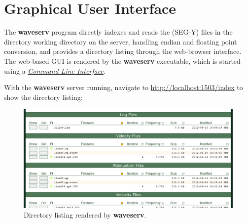 \documentclass[letterpaper,10pt,english]{sphinxmanual}
\begin{document}

\begin{fulllineitems}
\label{cli:cmdoption-waveserv-p}
\end{fulllineitems}



\chapter{Graphical User Interface}
\label{gui:gui}\label{gui::doc}\label{gui:graphical-user-interface}
The \textbf{waveserv} program directly indexes and reads the (SEG-Y) files in the directory working directory on the server, handling endian and floating point conversion, and provides a directory listing through the web-browser interface.  The web-based GUI is rendered by the \textbf{waveserv} executable, which is started using a {\hyperref[cli:cli]{\emph{Command Line Interface}}}.

With the \textbf{waveserv} server running, navigate to \href{http://localhost:1503/index}{http://localhost:1503/index} to show the directory listing:
\begin{figure}[htbp]
\centering
\capstart

\includegraphics{listing.png}
\caption{Directory listing rendered by \textbf{waveserv}.}\end{figure}
\end{document}
